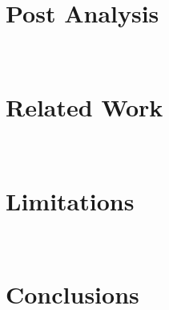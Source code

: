 \documentclass[conference,compsoc]{IEEEtran}
\begin{document}
\section{Post Analysis}~\label{sec:post}
\vspace{-4mm}


\section{Related Work}~\label{sec:related}


\section{Limitations}~\label{sec:limiations}


\section{Conclusions}~\label{sec:conclusion}





\begin{appendices}

\end{appendices}
\end{document}
